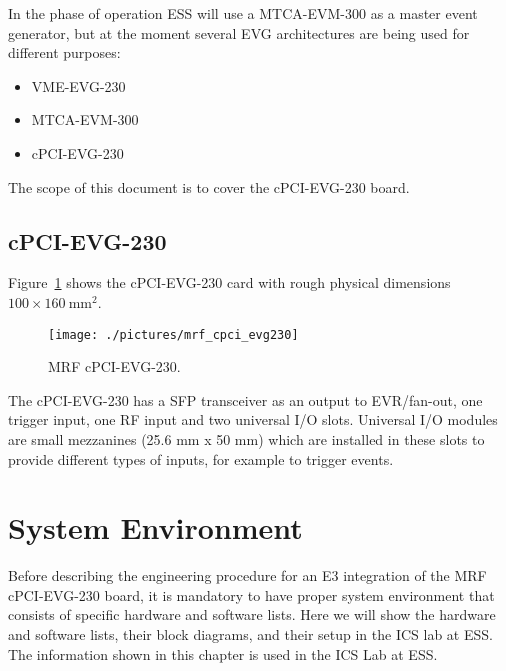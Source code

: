 \documentclass[11pt
  , a4paper
  , article
  , oneside
  , showtrims
]{memoir}
\begin{document}
In the phase of operation ESS will use a MTCA-EVM-300 as a master event generator, but at the moment several EVG architectures are being used for different purposes:
\begin{itemize}
\item VME-EVG-230
\item MTCA-EVM-300
\item cPCI-EVG-230
\end{itemize}

The scope of this document is to cover the cPCI-EVG-230 board.


\section{cPCI-EVG-230}
Figure~\ref{fig:cpci-evg230} shows the cPCI-EVG-230 card with rough physical dimensions $100\times 160~\mathrm{mm}{}^2$.

\begin{figure}[!htb]
  \centering
  \texttt{[image: ./pictures/mrf\_cpci\_evg230]}
  \caption{
    MRF cPCI-EVG-230.
  }
  \label{fig:cpci-evg230}
\end{figure}


The cPCI-EVG-230  has a SFP transceiver as an output to EVR/fan-out, one trigger input, one RF input and two universal I/O slots. Universal I/O modules are small mezzanines (25.6 mm x 50 mm) which are installed in these slots to provide different types of inputs, for example to trigger events.


\clearpage

\chapter{System Environment}
Before describing the engineering procedure for an E3 integration of the MRF cPCI-EVG-230 board, it is mandatory to have proper system environment that consists of specific hardware and software lists. Here we will show the hardware and software lists, their block diagrams, and their setup in the ICS lab at ESS. The information shown in this chapter is used in the ICS Lab at ESS.
\end{document}
